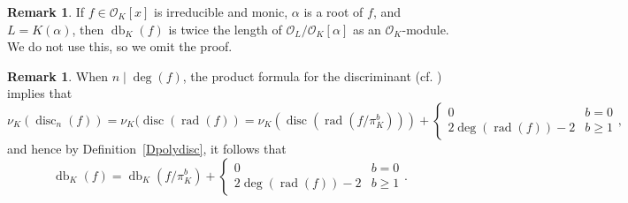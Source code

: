 \documentclass[12pt]{amsart}
\numberwithin{equation}{section}
\newtheorem{lemma}[equation]{Lemma}
\theoremstyle{definition}
\newtheorem{remark}[equation]{Remark}
\newcommand{\padma}[1]{{\color{Magenta} \sf $\clubsuit\clubsuit\clubsuit$ Padma: [#1]}}
\newcommand{\mc}[1]{\mathcal{#1}}
\DeclareMathOperator{\disc}{disc}
\DeclareMathOperator{\db}{db}
\DeclareMathOperator{\rad}{rad}
\begin{document}
\begin{remark}\label{Rcolength}
If $f \in \mc{O}_K[x]$ is irreducible and monic, $\alpha$ is a
root of $f$, and $L = K(\alpha)$, then $\db_K(f)$ is
twice the length of $\mc{O}_L / \mc{O}_K[\alpha]$ as an
$\mc{O}_K$-module.  We do not use this, so we omit the proof.
\end{remark}




\begin{remark}\label{Rdiscprop}
 When $n \mid \deg(f)$, the product formula for the discriminant (cf. \cite[Chapter~12, Equation~(1.23)]{GKZ}) implies that
 \[\nu_K( \disc_n(f)) = \nu_K(\disc(\rad(f)) = \nu_K(\disc(\rad(f/\pi_K^b)))+\begin{cases}0&b=0\\2\deg(\rad(f))-2&b\geq1 \end{cases},\]
 and hence by Definition~\ref{Dpolydisc}, it follows that
 \[ \db_K(f) = \db_K(f/\pi_K^b)+\begin{cases}0&b=0\\2\deg(\rad(f))-2&b\geq1 \end{cases}.\] 
\end{remark}

\end{document}
